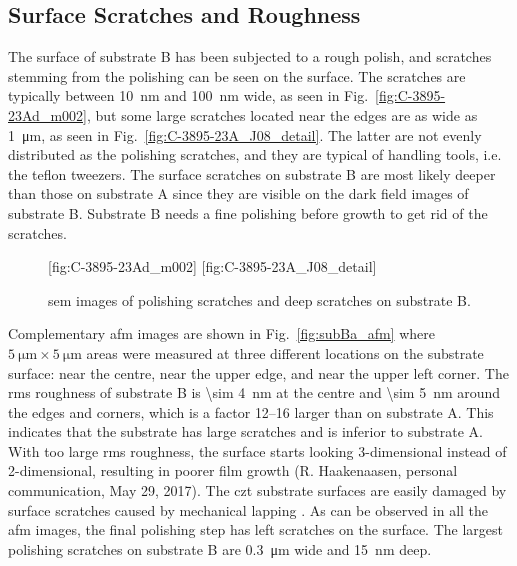 \subsection{Surface Scratches and Roughness}
The surface of substrate B has been subjected to a rough polish, and scratches stemming from the polishing can be seen on the surface. The scratches are typically between \SI{10}{\nano\metre} and \SI{100}{\nano\metre} wide, as seen in Fig.~\ref{fig:C-3895-23Ad_m002}, but some large scratches located near the edges are as wide as \SI{1}{\micro\metre}, as seen in Fig.~\ref{fig:C-3895-23A_J08_detail}. The latter are not evenly distributed as the polishing scratches, and they are typical of handling tools, i.e. the teflon tweezers. The surface scratches on substrate B are most likely deeper than those on substrate A since they are visible on the dark field images of substrate B. Substrate B needs a fine polishing before growth to get rid of the scratches.
\begin{figure}[htbp]
    \centering
    [fig:C-3895-23Ad_m002]
    [fig:C-3895-23A_J08_detail]
    \caption[\Ac{sem} images of scratches on substrate B.]{\Ac{sem} images of  polishing scratches and  deep scratches on substrate B.}
    \label{fig:SEM_C389523_scratches}
\end{figure}

Complementary \ac{afm} images are shown in Fig.~\ref{fig:subBa_afm} where $\SI{5}{\micro\metre}\times\SI{5}{\micro\metre}$ areas were measured at three different locations on the substrate surface: near the centre, near the upper edge, and near the upper left corner. The \ac{rms} roughness of substrate B is \SI{\sim 4}{\nano\metre} at the centre and \SI{\sim 5}{\nano\metre} around the edges and corners, which is a factor \SIrange{12}{16}{} larger than on substrate A. This indicates that the substrate has large scratches and is inferior to substrate A. With too large \ac{rms} roughness, the surface starts looking 3-dimensional instead of 2-dimensional, resulting in poorer film growth (R. Haakenaasen, personal communication, May 29, 2017). The \ac{czt} substrate surfaces are easily damaged by surface scratches caused by mechanical lapping \citep{egan2009scanning}. As can be observed in all the \ac{afm} images, the final polishing step has left scratches on the surface. The largest polishing scratches on substrate B are \SI{0.3}{\micro\metre} wide and \SI{15}{\nano\metre} deep.

